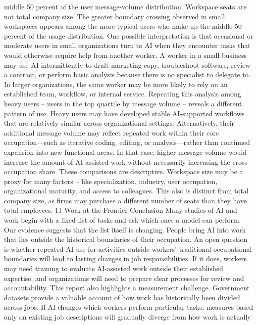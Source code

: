 middle 50 percent of the user message-volume distribution. Workspace seats are not total company size.
The greater boundary crossing observed in small workspaces appears among the more typical users who
make up the middle 50 percent of the usage distribution. One possible interpretation is that occasional or
moderate users in small organizations turn to AI when they encounter tasks that would otherwise require
help from another worker. A worker in a small business may use AI intermittently to draft marketing
copy, troubleshoot software, review a contract, or perform basic analysis because there is no specialist to
delegate to. In larger organizations, the same worker may be more likely to rely on an established team,
workflow, or internal service.
Repeating this analysis among heavy users – users in the top quartile by message volume – reveals
a different pattern of use. Heavy users may have developed stable AI-supported workflows that are
relatively similar across organizational settings. Alternatively, their additional message volume may
reflect repeated work within their core occupation—such as iterative coding, editing, or analysis—rather
than continued expansion into new functional areas. In that case, higher message volume would increase
the amount of AI-assisted work without necessarily increasing the cross-occupation share.
These comparisons are descriptive. Workspace size may be a proxy for many factors – like specialization,
industry, user occupation, organizational maturity, and access to colleagues. This also is distinct from
total company size, as firms may purchase a different number of seats than they have total employees.
11
Work at the Frontier
Conclusion
Many studies of AI and work begin with a fixed list of tasks and ask which ones a model can perform.
Our evidence suggests that the list itself is changing. People bring AI into work that lies outside the
historical boundaries of their occupation. An open question is whether repeated AI use for activities
outside workers’ traditional occupational boundaries will lead to lasting changes in job responsibilities. If
it does, workers may need training to evaluate AI-assisted work outside their established expertise, and
organizations will need to prepare clear processes for review and accountability.
This report also highlights a measurement challenge. Government datasets provide a valuable account
of how work has historically been divided across jobs. If AI changes which workers perform particular
tasks, measures based only on existing job descriptions will gradually diverge from how work is actually
